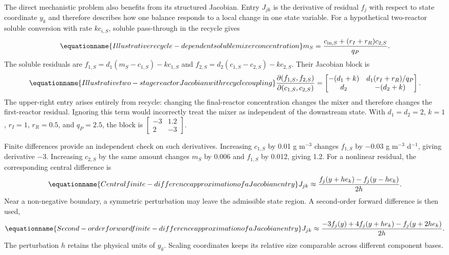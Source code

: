 The direct mechanistic problem also benefits from its structured Jacobian. Entry $J_{jk}$ is the derivative of residual $f_j$ with respect to state coordinate $y_k$ and therefore describes how one balance responds to a local change in one state variable. For a hypothetical two-reactor soluble conversion with rate $kc_{i,S}$, soluble pass-through in the recycle gives
\begin{equation}
\equationname{Illustrative recycle-dependent soluble mixer concentration}
m_S=\frac{c_{{\rm in},S}+(r_I+r_R)c_{2,S}}{q_P}.
\end{equation}
The soluble residuals are $f_{1,S}=d_1(m_S-c_{1,S})-kc_{1,S}$ and $f_{2,S}=d_2(c_{1,S}-c_{2,S})-kc_{2,S}$. Their Jacobian block is
\begin{equation}
\equationname{Illustrative two-stage reactor Jacobian with recycle coupling}
\frac{\partial(f_{1,S},f_{2,S})}{\partial(c_{1,S},c_{2,S})}
=\begin{bmatrix}
-(d_1+k)&d_1(r_I+r_R)/q_P\\
d_2&-(d_2+k)
\end{bmatrix}.
\end{equation}
The upper-right entry arises entirely from recycle: changing the final-reactor concentration changes the mixer and therefore changes the first-reactor residual. Ignoring this term would incorrectly treat the mixer as independent of the downstream state. With $d_1=d_2=2$, $k=1$, $r_I=1$, $r_R=0.5$, and $q_P=2.5$, the block is $\begin{bmatrix}-3&1.2\\2&-3\end{bmatrix}$.

Finite differences provide an independent check on such derivatives. Increasing $c_{1,S}$ by 0.01 g m$^{-3}$ changes $f_{1,S}$ by $-0.03$ g m$^{-3}$ d$^{-1}$, giving derivative $-3$. Increasing $c_{2,S}$ by the same amount changes $m_S$ by 0.006 and $f_{1,S}$ by 0.012, giving 1.2. For a nonlinear residual, the corresponding central difference is
\begin{equation}
\equationname{Central finite-difference approximation of a Jacobian entry}
J_{jk}\approx\frac{f_j(y+he_k)-f_j(y-he_k)}{2h}.
\end{equation}
Near a non-negative boundary, a symmetric perturbation may leave the admissible state region. A second-order forward difference is then used,
\begin{equation}
\equationname{Second-order forward finite-difference approximation of a Jacobian entry}
J_{jk}\approx\frac{-3f_j(y)+4f_j(y+he_k)-f_j(y+2he_k)}{2h}.
\end{equation}
The perturbation $h$ retains the physical units of $y_k$. Scaling coordinates keeps its relative size comparable across different component bases.

